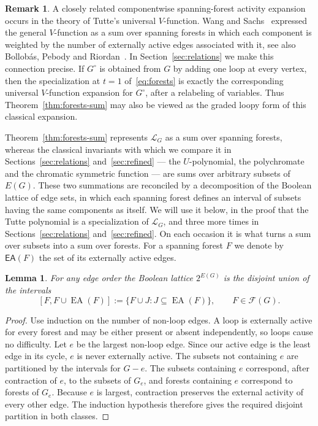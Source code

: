 \documentclass[11pt]{article}
\theoremstyle{plain}
\newtheorem{lemma}[theorem]{Lemma}
\theoremstyle{definition}
\newtheorem{remark}[theorem]{Remark}
\renewcommand{\mathcal}{\mathscr}
\newcommand{\LL}{\mathcal{L}}    %
\newcommand{\EA}{\mathsf{EA}} %
\numberwithin{equation}{section}
\begin{document}
\begin{remark}\label{rem:V-forest-history}
A closely related componentwise spanning-forest activity expansion occurs in
the theory of Tutte's universal $V$-function.  Wang and Sachs~\cite{WS}
expressed the general $V$-function as a sum over spanning forests in which
each component is weighted by the number of externally active edges associated
with it, see also Bollob\'as, Pebody and Riordan~\cite{BPR}.
In Section~\ref{sec:relations} we make this connection precise.  If $G^\circ$ is
obtained from $G$ by adding one loop at every vertex, then the specialization at $t=1$ of~\eqref{eq:forests} is exactly the corresponding universal $V$-function expansion for $G^\circ$, after a relabeling of variables.  Thus
Theorem~\ref{thm:forests-sum} may also be viewed as the graded loopy form of
this classical expansion.
\end{remark}

Theorem~\ref{thm:forests-sum} represents $\LL_G$ as a sum over spanning forests, whereas the
classical invariants with which we compare it in
Sections~\ref{sec:relations} and~\ref{sec:refined} --- the $U$-polynomial,
the polychromate and the chromatic symmetric function --- are sums over arbitrary subsets of $E(G)$.
These two summations are reconciled by a
decomposition of the Boolean lattice of edge sets, in which each spanning
forest defines an interval of subsets having the same components as itself.
We will use it below, in the proof
that the Tutte polynomial is a specialization of $\LL_G$, and three more times in Sections~\ref{sec:relations} and~\ref{sec:refined}.
On each occasion it is what turns a sum over
subsets into a sum over forests.
For a spanning forest $F$ we denote by $\EA(F)$ the set of its externally active edges.

\begin{lemma}\label{lem:activity-intervals}
For any edge order the Boolean lattice $2^{E(G)}$ is the disjoint union of the intervals
\begin{equation}\label{eq:activity-intervals}
  [F,F\cup\operatorname{EA}(F)]
  :=
  \{F\cup J:J\subseteq\operatorname{EA}(F)\},
  \qquad F\in\mathcal F(G).
\end{equation}
\end{lemma}

\begin{proof}
  Use induction on the number of non-loop edges.  A loop is externally active for every forest and may be either present or absent independently,
 so loops cause no difficulty.  Let $e$ be the largest non-loop edge.  Since our active edge is the least edge in its cycle, $e$ is never externally active.
The subsets not containing $e$ are partitioned by the intervals for $G-e$.
The subsets containing $e$ correspond, after contraction of $e$, to the subsets of $G_e$, and forests containing $e$ correspond to forests of $G_e$.
Because $e$ is largest, contraction preserves the external activity of every other edge.
The induction hypothesis therefore gives the required disjoint partition in both classes.
\end{proof}
\end{document}
